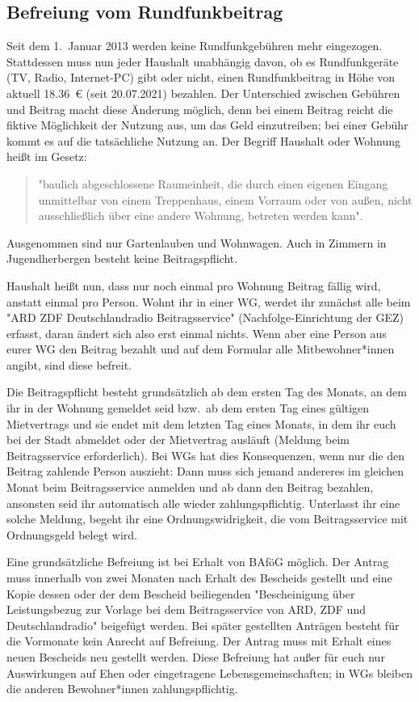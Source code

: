 \begin{multicols*}{2}
\subsection{Befreiung vom Rundfunkbeitrag}
Seit dem 1.~Januar 2013 werden keine Rundfunkgebühren mehr eingezogen.
Stattdessen muss nun jeder Haushalt unabhängig davon, ob es Rundfunkgeräte (TV, Radio, Internet-PC) gibt oder nicht, einen Rundfunkbeitrag in Höhe von aktuell \SI{18,36}{\euro} (seit 20.07.2021) bezahlen.
Der Unterschied zwischen Gebühren und Beitrag macht diese Änderung möglich, denn bei einem Beitrag reicht die fiktive Möglichkeit der Nutzung aus, um das Geld einzutreiben; bei einer Gebühr kommt es auf die tatsächliche Nutzung an.
Der Begriff Haushalt oder Wohnung heißt im Gesetz:
\begin{quote}
	"baulich abgeschlossene Raumeinheit, die durch einen eigenen Eingang unmittelbar von einem Treppenhaus, einem Vorraum oder von außen, nicht ausschließlich über eine andere Wohnung, betreten werden kann".
\end{quote}
Ausgenommen sind nur Gartenlauben und Wohnwagen.
Auch in Zimmern in Jugendherbergen besteht keine Beitragspflicht.

Haushalt heißt nun, dass nur noch einmal pro Wohnung Beitrag fällig wird, anstatt einmal pro Person.
Wohnt ihr in einer WG, werdet ihr zunächst alle beim "ARD ZDF Deutschlandradio Beitragsservice" (Nachfolge-Einrichtung der GEZ) erfasst, daran ändert sich also erst einmal nichts.
Wenn aber eine Person aus eurer WG den Beitrag bezahlt und auf dem Formular alle Mitbewohner*innen angibt, sind diese befreit.

Die Beitragspflicht besteht grundsätzlich ab dem ersten Tag des Monats, an dem ihr in der Wohnung gemeldet seid bzw.\ ab dem ersten Tag eines gültigen Mietvertrags und sie endet mit dem letzten Tag eines Monats, in dem ihr euch bei der Stadt abmeldet oder der Mietvertrag ausläuft (Meldung beim Beitragsservice erforderlich).
Bei WGs hat dies Konsequenzen, wenn nur die den Beitrag zahlende Person auszieht: Dann muss sich jemand andereres im gleichen Monat beim Beitragsservice anmelden und ab dann den Beitrag bezahlen, ansonsten seid ihr automatisch alle wieder zahlungspflichtig.
Unterlasst ihr eine solche Meldung, begeht ihr eine Ordnungswidrigkeit, die vom Beitragsservice mit Ordnungsgeld belegt wird.

Eine grundsätzliche Befreiung ist bei Erhalt von BAföG möglich.
Der Antrag muss innerhalb von zwei Monaten nach Erhalt des Bescheids gestellt und eine Kopie dessen oder der dem Bescheid beiliegenden "Bescheinigung über Leistungsbezug zur Vorlage bei dem Beitragsservice von ARD, ZDF und Deutschlandradio" beigefügt werden.
Bei später gestellten Anträgen besteht für die Vormonate kein Anrecht auf Befreiung.
Der Antrag muss mit Erhalt eines neuen Bescheids neu gestellt werden.
Diese Befreiung hat außer für euch nur Auswirkungen auf Ehen oder eingetragene Lebensgemeinschaften; in WGs bleiben die anderen Bewohner*innen zahlungspflichtig.


\end{multicols*}
